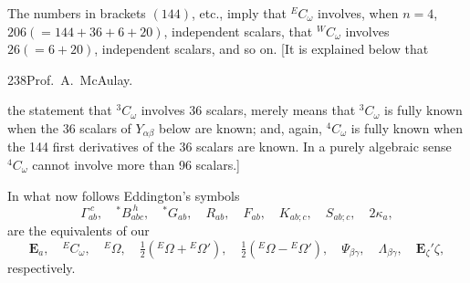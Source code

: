 \documentclass[11pt]{article}
\begin{document}
\indent The numbers in brackets $(144)$, etc., imply that ${}^E C_\omega$ involves, when $n=4$, $206(=144+36+6+20)$, independent scalars, that ${}^W C_\omega$ involves $26(=6+20)$, independent scalars, and so on. [It is explained below that
\newpage\thispagestyle{empty}\begin{center}238\hfill Prof.\ A.\ McAulay.\end{center}
the statement that ${}^3C_\omega$ involves 36 scalars, merely means that ${}^3C_\omega$ is fully known when the 36 scalars of $Y_{\alpha\beta}$ below are known; and, again, ${}^4C_\omega$ is fully known when the 144 first derivatives of the 36 scalars are known. In a purely algebraic sense ${}^4C_\omega$ cannot involve more than 96 scalars.]

\indent In what now follows Eddington's symbols
\[
\Gamma_{ab}^{\ c},\quad {}^*B_{abc}^{\ h},\quad {}^*G_{ab},\quad R_{ab},\quad F_{ab},\quad K_{ab;c},\quad S_{ab;c},\quad 2\kappa_a,
\]
are the equivalents of our
\[
\mathbf{E}_a,\quad {}^E C_\omega,\quad {}^E\Omega,\quad \tfrac12({}^E\Omega+{}^E\Omega'),\quad \tfrac12({}^E\Omega-{}^E\Omega'),\quad \Psi_{\beta\gamma},\quad \Lambda_{\beta\gamma},\quad \mathbf{E}_\zeta'\zeta,
\]
respectively.
\end{document}
